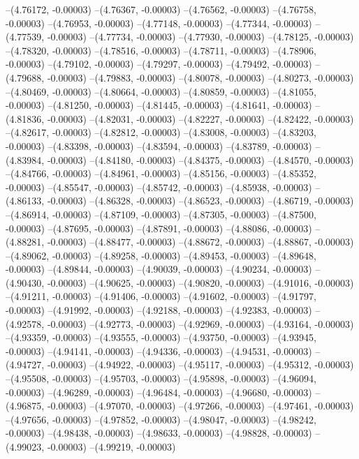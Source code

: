 --(4.76172, -0.00003)
--(4.76367, -0.00003)
--(4.76562, -0.00003)
--(4.76758, -0.00003)
--(4.76953, -0.00003)
--(4.77148, -0.00003)
--(4.77344, -0.00003)
--(4.77539, -0.00003)
--(4.77734, -0.00003)
--(4.77930, -0.00003)
--(4.78125, -0.00003)
--(4.78320, -0.00003)
--(4.78516, -0.00003)
--(4.78711, -0.00003)
--(4.78906, -0.00003)
--(4.79102, -0.00003)
--(4.79297, -0.00003)
--(4.79492, -0.00003)
--(4.79688, -0.00003)
--(4.79883, -0.00003)
--(4.80078, -0.00003)
--(4.80273, -0.00003)
--(4.80469, -0.00003)
--(4.80664, -0.00003)
--(4.80859, -0.00003)
--(4.81055, -0.00003)
--(4.81250, -0.00003)
--(4.81445, -0.00003)
--(4.81641, -0.00003)
--(4.81836, -0.00003)
--(4.82031, -0.00003)
--(4.82227, -0.00003)
--(4.82422, -0.00003)
--(4.82617, -0.00003)
--(4.82812, -0.00003)
--(4.83008, -0.00003)
--(4.83203, -0.00003)
--(4.83398, -0.00003)
--(4.83594, -0.00003)
--(4.83789, -0.00003)
--(4.83984, -0.00003)
--(4.84180, -0.00003)
--(4.84375, -0.00003)
--(4.84570, -0.00003)
--(4.84766, -0.00003)
--(4.84961, -0.00003)
--(4.85156, -0.00003)
--(4.85352, -0.00003)
--(4.85547, -0.00003)
--(4.85742, -0.00003)
--(4.85938, -0.00003)
--(4.86133, -0.00003)
--(4.86328, -0.00003)
--(4.86523, -0.00003)
--(4.86719, -0.00003)
--(4.86914, -0.00003)
--(4.87109, -0.00003)
--(4.87305, -0.00003)
--(4.87500, -0.00003)
--(4.87695, -0.00003)
--(4.87891, -0.00003)
--(4.88086, -0.00003)
--(4.88281, -0.00003)
--(4.88477, -0.00003)
--(4.88672, -0.00003)
--(4.88867, -0.00003)
--(4.89062, -0.00003)
--(4.89258, -0.00003)
--(4.89453, -0.00003)
--(4.89648, -0.00003)
--(4.89844, -0.00003)
--(4.90039, -0.00003)
--(4.90234, -0.00003)
--(4.90430, -0.00003)
--(4.90625, -0.00003)
--(4.90820, -0.00003)
--(4.91016, -0.00003)
--(4.91211, -0.00003)
--(4.91406, -0.00003)
--(4.91602, -0.00003)
--(4.91797, -0.00003)
--(4.91992, -0.00003)
--(4.92188, -0.00003)
--(4.92383, -0.00003)
--(4.92578, -0.00003)
--(4.92773, -0.00003)
--(4.92969, -0.00003)
--(4.93164, -0.00003)
--(4.93359, -0.00003)
--(4.93555, -0.00003)
--(4.93750, -0.00003)
--(4.93945, -0.00003)
--(4.94141, -0.00003)
--(4.94336, -0.00003)
--(4.94531, -0.00003)
--(4.94727, -0.00003)
--(4.94922, -0.00003)
--(4.95117, -0.00003)
--(4.95312, -0.00003)
--(4.95508, -0.00003)
--(4.95703, -0.00003)
--(4.95898, -0.00003)
--(4.96094, -0.00003)
--(4.96289, -0.00003)
--(4.96484, -0.00003)
--(4.96680, -0.00003)
--(4.96875, -0.00003)
--(4.97070, -0.00003)
--(4.97266, -0.00003)
--(4.97461, -0.00003)
--(4.97656, -0.00003)
--(4.97852, -0.00003)
--(4.98047, -0.00003)
--(4.98242, -0.00003)
--(4.98438, -0.00003)
--(4.98633, -0.00003)
--(4.98828, -0.00003)
--(4.99023, -0.00003)
--(4.99219, -0.00003)
